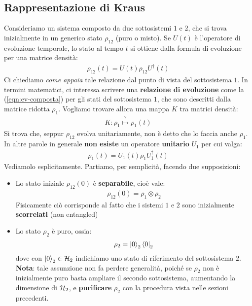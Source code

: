 \documentclass[../../InformazioneQuantistica.tex]{subfiles}
\begin{document}
\subsection{Rappresentazione di Kraus} %
Consideriamo un sistema composto da due sottosistemi $1$ e $2$, che si trova inizialmente in un generico stato $\rho_{12}$ (puro o misto). Se $U(t)$ è l'operatore di evoluzione temporale, lo stato al tempo $t$ si ottiene dalla formula di evoluzione per una matrice densità:
\begin{align}
\rho_{12}(t) = U(t) \rho_{12}U^\dag(t)
\label{eqn:ev-composta}
\end{align}
Ci chiediamo \textit{come appaia} tale relazione dal punto di vista del sottosistema $1$. In termini matematici, ci interessa scrivere una \textbf{relazione di evoluzione} come la (\ref{eqn:ev-composta}) per gli stati del sottosistema $1$, che sono descritti dalla matrice ridotta $\rho_1$. Vogliamo trovare allora una mappa $K$ tra matrici densità:
\begin{align*}
K:\rho_1 \overset{?}{\mapsto} \rho_1(t)
\end{align*}
Si trova che, seppur $\rho_{12}$ evolva unitariamente, non è detto che lo faccia anche $\rho_1$. In altre parole in generale \textbf{non esiste} un operatore \textbf{unitario} $U_1$ per cui valga:
\begin{align}
    \rho_1(t) = U_1(t) \rho_1 U_1^\dag(t)
    \label{eqn:rho1-unitaria}
\end{align}
Vediamolo esplicitamente. Partiamo, per semplicità, facendo due supposizioni:
\begin{itemize}
\item Lo stato iniziale $\rho_{12}(0)$ è \textbf{separabile}, cioè vale:
\begin{align*}
\rho_{12}(0) = \rho_1 \otimes \rho_2
\end{align*}
Fisicamente ciò corrisponde al fatto che i sistemi $1$ e $2$ sono inizialmente \textbf{scorrelati} (non entangled)
\item Lo stato $\rho_2$ è puro, ossia:
\begin{align*}
\rho_2 = \Ket{0}_2 \Bra{0}_2
\end{align*}
dove con $\Ket{0}_2 \in \mathcal{H}_2$ indichiamo uno stato di riferimento del sottosistema $2$.\\
\textbf{Nota}: tale assunzione non fa perdere generalità, poiché se $\rho_2$ non è inizialmente puro basta ampliare il secondo sottosistema, aumentando la dimensione di $\mathcal{H}_2$, e \textbf{purificare} $\rho_2$ con la procedura vista nelle sezioni precedenti.
\end{itemize} 
\end{document}
